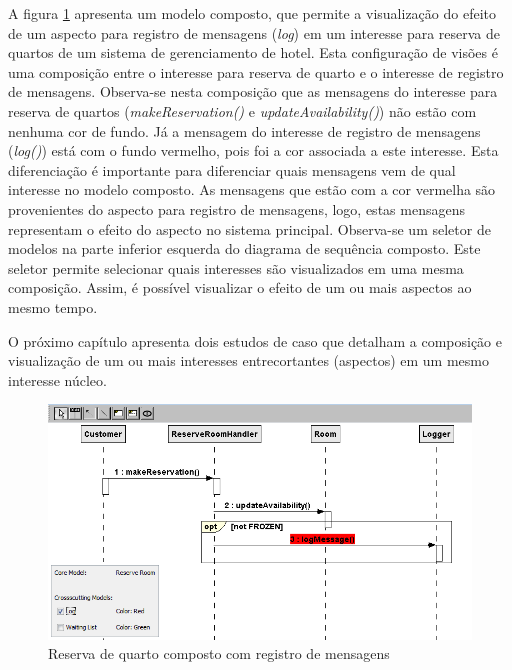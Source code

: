 A figura \ref{fig:case_study_compound_1} apresenta um modelo composto, que permite a visualização do efeito de um aspecto para registro de mensagens
(\textit{log}) em um interesse para reserva de quartos de um sistema de gerenciamento de hotel. Esta configuração de visões é uma composição
entre o interesse para reserva de quarto e o interesse de registro de mensagens. Observa-se nesta composição que as mensagens do interesse para reserva de 
quartos (\textit{makeReservation()} e \textit{updateAvailability()}) não estão com nenhuma cor de fundo. Já a mensagem do interesse de registro de
mensagens (\textit{log()}) está com o fundo vermelho, pois foi a cor associada a este interesse. Esta diferenciação é importante para diferenciar quais mensagens 
vem de qual interesse no modelo composto. As mensagens que estão com a cor vermelha são provenientes do aspecto para registro de mensagens, logo,
estas mensagens representam o efeito do aspecto no sistema principal. Observa-se um seletor de modelos na parte inferior esquerda do diagrama de
sequência composto. Este seletor permite selecionar quais interesses são visualizados em uma mesma composição. Assim, é possível visualizar o efeito
de um ou mais aspectos ao mesmo tempo. 

O próximo capítulo apresenta dois estudos de caso que detalham a composição e visualização de um ou mais interesses entrecortantes (aspectos) em um
mesmo interesse núcleo.

\begin{landscape}
  \begin{figure}[]
	\centering
	\includegraphics{img/case_study_compound_1.png}
	\caption{Reserva de quarto composto com registro de mensagens}\label{fig:case_study_compound_1}
  \end{figure}
\end{landscape}